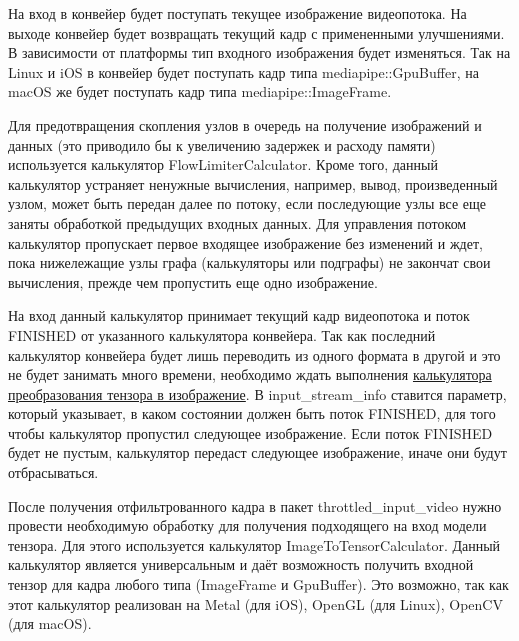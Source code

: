 \documentclass[a4paper,14pt]{extreport}
\begin{document}
        На вход в конвейер будет поступать текущее изображение видеопотока. На выходе конвейер будет возвращать текущий кадр с примененными улучшениями. В зависимости от платформы тип входного изображения будет изменяться. Так на Linux и iOS в конвейер будет поступать кадр типа mediapipe::GpuBuffer, на macOS же будет поступать кадр типа mediapipe::ImageFrame.
        

        Для предотвращения скопления узлов в очередь на получение изображений и данных (это приводило бы к увеличению задержек и расходу памяти) используется калькулятор FlowLimiterCalculator. Кроме того, данный калькулятор устраняет ненужные вычисления, например, вывод, произведенный узлом, может быть передан далее по потоку, если последующие узлы все еще заняты обработкой предыдущих входных данных. Для управления потоком калькулятор пропускает первое входящее изображение без изменений и ждет, пока нижележащие узлы графа (калькуляторы или подграфы) не закончат свои вычисления, прежде чем пропустить еще одно изображение.

        На вход данный калькулятор принимает текущий кадр видеопотока и поток FINISHED от указанного калькулятора конвейера. Так как последний калькулятор конвейера будет лишь переводить из одного формата в другой и это не будет занимать много времени, необходимо ждать выполнения \hyperlink{TensorToImage}{калькулятора преобразования тензора в изображение}. В input\_stream\_info ставится параметр, который указывает, в каком состоянии должен быть поток FINISHED, для того чтобы калькулятор пропустил следующее изображение. Если поток FINISHED будет не пустым, калькулятор передаст следующее изображение, иначе они будут отбрасываться.
        

        После получения отфильтрованного кадра в пакет throttled\_input\_video нужно провести необходимую обработку для получения подходящего на вход модели тензора. Для этого используется калькулятор ImageToTensorCalculator. Данный калькулятор является универсальным и даёт возможность получить входной тензор для кадра любого типа (ImageFrame и GpuBuffer). Это возможно, так как этот калькулятор реализован на Metal (для iOS), OpenGL (для Linux), OpenCV (для macOS).
\end{document}
